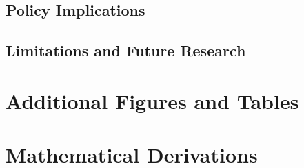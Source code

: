\documentclass[12pt,a4paper]{report}
\theoremstyle{definition}
\begin{document}
\section{Policy Implications}
\label{sec:policy}

\section{Limitations and Future Research}
\label{sec:limitations}


\newpage
\printbibliography[heading=bibintoc,title={References}]

\appendix
\chapter{Additional Figures and Tables}
\label{app:figures}

\chapter{Mathematical Derivations}
\label{app:derivations}
\end{document}
